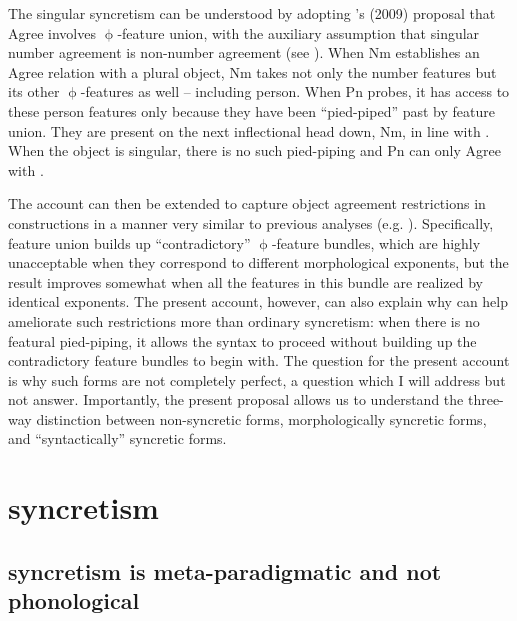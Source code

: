\documentclass[output=paper]{langscibook}
\begin{document}
The singular syncretism can be understood by adopting \citeauthor{Kratzer:2009jq}'s (2009) proposal that Agree involves $\upphi$-feature union, with the auxiliary assumption that singular number agreement is non-number agreement (see \citealt{Nevins2010:ab}). When Nm establishes an Agree relation with a plural object, Nm takes not only the number features but its other $\upphi$-features as well -- including person. When Pn probes, it has access to these person features only because they have been “pied-piped” past \sti by feature union. They are present on the next inflectional head down, Nm, in line with  \citet{baker2010agreement}. When the object is singular, there is no such pied-piping and Pn can only Agree with \stin. 

The account can then be extended to capture object agreement restrictions in \datnom constructions in a manner very similar to previous analyses (e.g. \citealt{DAlessandro:2003oy,Holmberg:2004gk,Schutze:2003mh,SigurTHsson:2008dm,Ussery:2009jd}). Specifically, feature union builds up “contradictory” $\upphi$-feature bundles, which are highly unacceptable when they correspond to different morphological exponents, but the result improves somewhat when all the features in this bundle are realized by identical exponents. The present account, however, can also explain why \sti can help ameliorate such restrictions more than ordinary syncretism: when there is no featural pied-piping, it allows the syntax to proceed without building up the contradictory feature bundles to begin with. The question for the present account is why such forms are not completely perfect, a question which I will address but not answer. Importantly, the present proposal allows us to understand the three-way distinction between non-syncretic forms, morphologically syncretic forms, and “syntactically” syncretic forms. 


\section{\sti syncretism} 

\subsection{\sti syncretism is meta-paradigmatic and not phonological}
\end{document}
